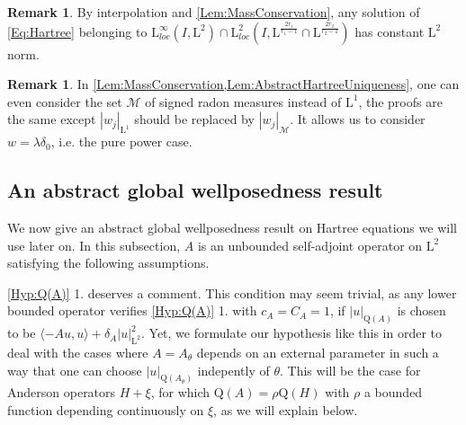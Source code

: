 \documentclass{article}
\def\L{\mathrm L}
\def\Q{\mathrm Q}
\newtheorem{hyp}[theo]{Assumption}
\theoremstyle{definition}
\newtheorem{rem}[theo]{Remark}
\numberwithin{equation}{section}
\begin{document}
\begin{rem}By interpolation and \cref{Lem:MassConservation}, any solution of \cref{Eq:Hartree} belonging to $\L^\infty_{loc}(I,\L^2)\cap\L^2_{loc}(I,\L^{\frac{2r_1}{r_1-1}}\cap\L^{\frac{2r_2}{r_2-1}})$ has constant $\L^2$ norm.
\end{rem}

\begin{rem}

    In \cref{Lem:MassConservation,Lem:AbstractHartreeUniqueness}, one can even consider the set $\mathcal{M}$ of signed radon measures instead of $\L^1$, the proofs are the same except $|w_j|_{\L^1}$ should be replaced by $|w_j|_{\mathcal{M}}$. It allows us to consider $w=\lambda\delta_0$, i.e. the pure power case.

\end{rem}

\subsection{An abstract global wellposedness result}

We now give an abstract global wellposedness result on Hartree equations we will use later on. In this subsection, $A$ is an unbounded self-adjoint operator on $\L^2$ satisfying the following assumptions.

\cref{Hyp:Q(A)} 1. deserves a comment. This condition may seem trivial, as any lower bounded operator verifies \cref{Hyp:Q(A)} 1. with $c_A=C_A=1$, if $|u|_{\Q(A)}$ is chosen to be $\langle -Au,u\rangle+\delta_A|u|_{\L^2}^2$. Yet, we formulate our hypothesis like this in order to deal with the cases where $A=A_\theta$ depends on an external parameter in such a way that one can choose $|u|_{\Q(A_\theta)}$ indepently of $\theta$. This will be the case for Anderson operators $H+\xi$, for which $\Q(A)=\rho\Q(H)$ with $\rho$ a bounded function depending continuously on $\xi$, as we will explain below.\\
\end{document}

